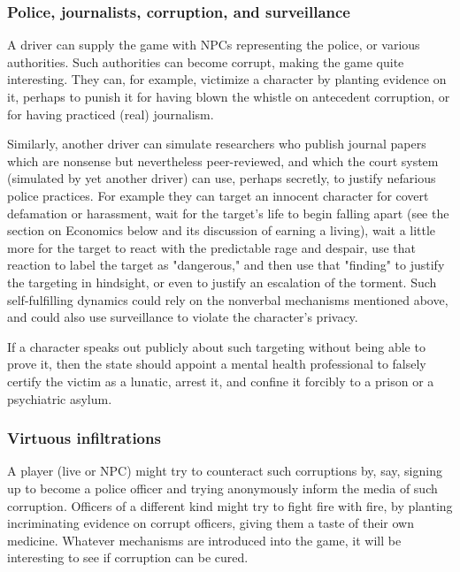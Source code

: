 \subsubsection{Police, journalists, corruption, and surveillance}

A driver can supply the game with NPCs representing
the police, or various authorities.
Such authorities can become corrupt, making the game quite interesting.
They can, for example, victimize a character by planting evidence on it,
perhaps to punish it for having blown the whistle on antecedent corruption,
or for having practiced (real) journalism.

Similarly, another driver can simulate researchers who publish journal papers
which are nonsense but nevertheless peer-reviewed, and which the court system
(simulated by yet another driver) can use, perhaps secretly, to justify
nefarious police practices.
For example they can target
an innocent character for covert defamation or harassment, wait for
the target's life to begin falling apart (see the section on Economics below
and its discussion of earning a living), wait a little more for the target to
react with the predictable rage and despair, use that reaction to label the
target as "dangerous," and then use that "finding" to justify the targeting
in hindsight, or even to justify an escalation of the torment.
Such self-fulfilling dynamics could
rely on the nonverbal mechanisms mentioned above, and could also use
surveillance to violate the character's privacy.

If a character speaks out publicly about such targeting without being able to
prove it, then the state should appoint a mental health professional to falsely
certify the victim as a lunatic, arrest it, and confine it forcibly to a prison
or a psychiatric asylum.

\subsubsection{Virtuous infiltrations}

A player (live or NPC) might try to counteract such corruptions by, say,
signing up to become a police officer and trying anonymously inform the media
of such corruption.
Officers of a different kind might try to fight fire with fire,
by planting incriminating evidence on corrupt officers, giving them a taste
of their own medicine.
Whatever mechanisms are introduced into the game,
it will be interesting to see if corruption can be cured.

